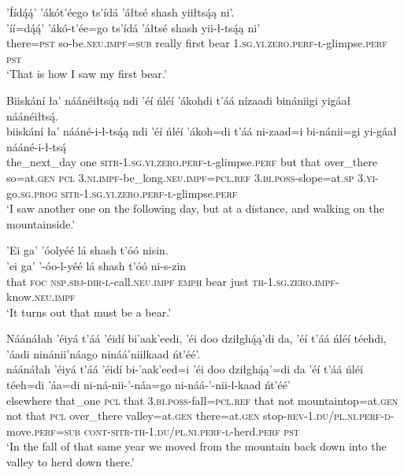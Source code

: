 \ea\label{ex:text6-5-22}
’Íídą́ą́’ ’ákót’éego ts’ídá ’áłtsé shash yiiłtsą́ą ni’.\\
\gll ’íí=dą́ą́’	’ákó-t’ée=go	ts’ídá	’áłtsé	shash	yii-ł-tsą́ą	ni’\\
     there=\textsc{pst}	so-be.\textsc{neu}.\textsc{impf}=\textsc{sub}	really	first	bear	1.\textsc{sg}.\textsc{yi}.\textsc{zero}.\textsc{perf}-\textsc{ł}-glimpse.\textsc{perf}	\textsc{pst}\\
\glt `That is how I saw my first bear.'
\z

\ea\label{ex:text6-5-23}
Biiskání ła’ náánéiłtsą́ą ndi ’éí ńléí ’ákohdi t’áá nízaadi binániigi yigáał náánéiłtsą́.\\
\gll biiskání	ła’	nááné-i-ł-tsą́ą	ndi	’éí	ńléí	’ákoh=di	t’áá	ni-zaad=i	bi-nánii=gi	yi-gáał	nááné-i-ł-tsą́\\
     the\_next\_day	one	\textsc{sitr}-1.\textsc{sg}.\textsc{yi}.\textsc{zero}.\textsc{perf}-\textsc{ł}-glimpse.\textsc{perf}	but	that	over\_there	so=at.\textsc{gen}	\textsc{pcl}	3.\textsc{ni}.\textsc{impf}-be\_long.\textsc{neu}.\textsc{impf}=\textsc{pcl}.\textsc{ref}	3.\textsc{bi}.\textsc{poss}-slope=at.\textsc{sp}	3.\textsc{yi}-go.\textsc{sg}.\textsc{prog}	\textsc{sitr}-1.\textsc{sg}.\textsc{yi}.\textsc{zero}.\textsc{perf}-\textsc{ł}-glimpse.\textsc{perf}\\
\glt `I saw another one on the following day, but at a distance, and walking on the mountainside.'
\z

\ea\label{ex:text6-5-24}
’Ei ga’ ’óolyéé lá shash t’óó nisin.\\
\gll ’ei	ga’	’-óo-l-yéé	lá	shash	t’óó	ni-s-zin\\
     that	\textsc{foc}	\textsc{nsp}.\textsc{sbj}-\textsc{dir}-\textsc{l}-call.\textsc{neu}.\textsc{impf}	\textsc{emph}	bear	just	\textsc{th}-1.\textsc{sg}.\textsc{zero}.\textsc{impf}-know.\textsc{neu}.\textsc{impf}\\
\glt `It turns out that must be a bear.'
\z

\ea\label{ex:text6-6-1}
Náánáłah ’éiyá t’áá ’éidí bi’aak’eedi, ’éi doo dziłghą́ą’di da, ’éí t’áá ńléí téehdi, ’áadi ninánii’náago nináá’niilkaad ńt’éé’.\\
\gll náánáłah	’éiyá	t’áá	’éidí	bi-’aak’eed=i	’éi	doo	dziłghą́ą’=di	da	’éí	t’áá	ńléí	téeh=di	’áa=di	ni-ná-nii-’-náa=go	ni-náá-’-nii-l-kaad	ńt’éé’\\
     elsewhere	that\_one	\textsc{pcl}	that	3.\textsc{bi}.\textsc{poss}-fall=\textsc{pcl}.\textsc{ref}	that	not	mountaintop=at.\textsc{gen}	not	that	\textsc{pcl}	over\_there	valley=at.\textsc{gen}	there=at.\textsc{gen}	stop-\textsc{rev}-1.\textsc{du}/\textsc{pl}.\textsc{ni}.\textsc{perf}-\textsc{d}-move.\textsc{perf}=\textsc{sub}	\textsc{cont}-\textsc{sitr}-\textsc{th}-1.\textsc{du}/\textsc{pl}.\textsc{ni}.\textsc{perf}-\textsc{l}-herd.\textsc{perf}	\textsc{pst}\\
\glt `In the fall of that same year we moved from the mountain back down into the valley to herd down there.'
\z

